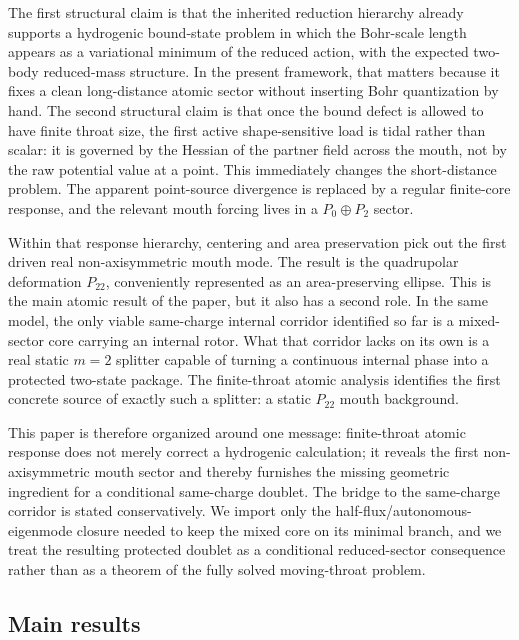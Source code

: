 \documentclass[11pt]{article}
\theoremstyle{plain}
\theoremstyle{definition}
\theoremstyle{remark}
\newcommand{\Ptwotwo}{P_{22}}
\begin{document}
The first structural claim is that the inherited reduction hierarchy already supports a hydrogenic bound-state problem in which the Bohr-scale length appears as a variational minimum of the reduced action, with the expected two-body reduced-mass structure. In the present framework, that matters because it fixes a clean long-distance atomic sector without inserting Bohr quantization by hand. The second structural claim is that once the bound defect is allowed to have finite throat size, the first active shape-sensitive load is tidal rather than scalar: it is governed by the Hessian of the partner field across the mouth, not by the raw potential value at a point. This immediately changes the short-distance problem. The apparent point-source divergence is replaced by a regular finite-core response, and the relevant mouth forcing lives in a \(P_0 \oplus P_2\) sector.

Within that response hierarchy, centering and area preservation pick out the first driven real non-axisymmetric mouth mode. The result is the quadrupolar deformation \(\Ptwotwo\), conveniently represented as an area-preserving ellipse. This is the main atomic result of the paper, but it also has a second role. In the same model, the only viable same-charge internal corridor identified so far is a mixed-sector core carrying an internal rotor. What that corridor lacks on its own is a real static \(m=2\) splitter capable of turning a continuous internal phase into a protected two-state package. The finite-throat atomic analysis identifies the first concrete source of exactly such a splitter: a static \(\Ptwotwo\) mouth background.

This paper is therefore organized around one message: finite-throat atomic response does not merely correct a hydrogenic calculation; it reveals the first non-axisymmetric mouth sector and thereby furnishes the missing geometric ingredient for a conditional same-charge doublet. The bridge to the same-charge corridor is stated conservatively. We import only the half-flux/autonomous-eigenmode closure needed to keep the mixed core on its minimal branch, and we treat the resulting protected doublet as a conditional reduced-sector consequence rather than as a theorem of the fully solved moving-throat problem.

\subsection{Main results}\label{subsec:intro-results}
\end{document}

